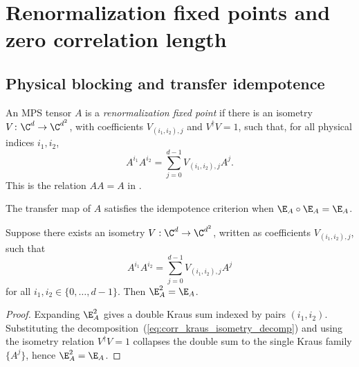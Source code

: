 \section{Renormalization fixed points and zero correlation length}

\subsection{Physical blocking and transfer idempotence}

\begin{definition}
    \label{def:physical_blocking_isometry}
    \leanok
    An MPS tensor $A$ is a \emph{renormalization fixed point} if there is an
    isometry $V\colon \C^d\to\C^{d^2}$, with coefficients
    $V_{(i_1,i_2),j}$ and $V^\dagger V=1$, such that, for all physical indices
    $i_1,i_2$,
    \begin{equation}\label{eq:corr_physical_blocking_isometry}
        A^{i_1}A^{i_2}
        =\sum_{j=0}^{d-1}V_{(i_1,i_2),j}A^j.
    \end{equation}
    This is the relation $AA=A$ in
    \cite[Definition~3.2]{Cirac2016MPDO_arXiv}.
\end{definition}

\begin{definition}\label{def:mps_transfer_idempotence}
    \leanok
    The transfer map of $A$ satisfies the idempotence criterion when
    $\E_A\circ\E_A=\E_A$.
\end{definition}

\begin{theorem}
    \label{thm:physical_blocking_implies_transfer_idempotence}
    \leanok
    Suppose there exists an isometry
    $V : \C^d \to \C^{d^2}$, written as coefficients $V_{(i_1,i_2),j}$, such
    that
    \begin{equation}\label{eq:corr_kraus_isometry_decomp}
        A^{i_1} A^{i_2} = \sum_{j=0}^{d-1} V_{(i_1,i_2),j} A^j
    \end{equation}
    for all $i_1,i_2 \in \{0,\ldots,d-1\}$.
    Then $\E_A^2=\E_A$.
\end{theorem}
\begin{proof}\leanok
    Expanding $\E_A^2$ gives a double Kraus sum indexed by pairs $(i_1,i_2)$.
    Substituting the decomposition~(\ref{eq:corr_kraus_isometry_decomp}) and
    using the isometry relation
    $V^\dagger V = 1$ collapses the double sum to the single Kraus family
    $\{A^j\}$, hence $\E_A^2 = \E_A$.
\end{proof}

